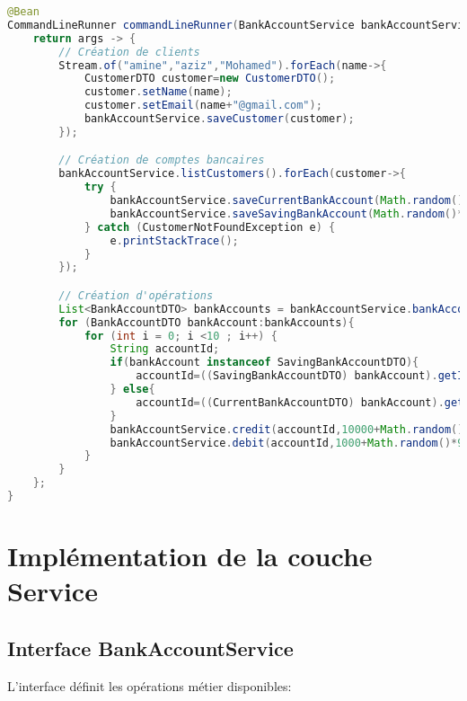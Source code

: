 \documentclass[12pt,a4paper]{report}
\begin{document}
\begin{lstlisting}[language=Java, caption=Initialisation des données]
@Bean
CommandLineRunner commandLineRunner(BankAccountService bankAccountService){
    return args -> {
        // Création de clients
        Stream.of("amine","aziz","Mohamed").forEach(name->{
            CustomerDTO customer=new CustomerDTO();
            customer.setName(name);
            customer.setEmail(name+"@gmail.com");
            bankAccountService.saveCustomer(customer);
        });

        // Création de comptes bancaires
        bankAccountService.listCustomers().forEach(customer->{
            try {
                bankAccountService.saveCurrentBankAccount(Math.random()*90000,9000,customer.getId());
                bankAccountService.saveSavingBankAccount(Math.random()*120000,5.5,customer.getId());
            } catch (CustomerNotFoundException e) {
                e.printStackTrace();
            }
        });

        // Création d'opérations
        List<BankAccountDTO> bankAccounts = bankAccountService.bankAccountList();
        for (BankAccountDTO bankAccount:bankAccounts){
            for (int i = 0; i <10 ; i++) {
                String accountId;
                if(bankAccount instanceof SavingBankAccountDTO){
                    accountId=((SavingBankAccountDTO) bankAccount).getId();
                } else{
                    accountId=((CurrentBankAccountDTO) bankAccount).getId();
                }
                bankAccountService.credit(accountId,10000+Math.random()*120000,"Credit");
                bankAccountService.debit(accountId,1000+Math.random()*9000,"Debit");
            }
        }
    };
}
\end{lstlisting}

\chapter{Implémentation de la couche Service}
\section{Interface BankAccountService}
L'interface définit les opérations métier disponibles:
\end{document}
